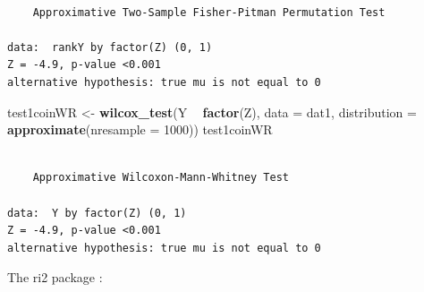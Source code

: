 \documentclass[
  12pt,
]{book}
\newenvironment{Shaded}{\begin{snugshade}}{\end{snugshade}}
\newcommand{\CommentTok}[1]{\textcolor[rgb]{0.56,0.35,0.01}{\textit{#1}}}
\newcommand{\DataTypeTok}[1]{\textcolor[rgb]{0.13,0.29,0.53}{#1}}
\newcommand{\DecValTok}[1]{\textcolor[rgb]{0.00,0.00,0.81}{#1}}
\newcommand{\KeywordTok}[1]{\textcolor[rgb]{0.13,0.29,0.53}{\textbf{#1}}}
\newcommand{\NormalTok}[1]{#1}
\newcommand{\OperatorTok}[1]{\textcolor[rgb]{0.81,0.36,0.00}{\textbf{#1}}}
\newcommand{\StringTok}[1]{\textcolor[rgb]{0.31,0.60,0.02}{#1}}
\theoremstyle{definition}
\theoremstyle{definition}
\theoremstyle{definition}
\theoremstyle{remark}
\begin{document}
\begin{verbatim}

    Approximative Two-Sample Fisher-Pitman Permutation Test

data:  rankY by factor(Z) (0, 1)
Z = -4.9, p-value <0.001
alternative hypothesis: true mu is not equal to 0
\end{verbatim}

\begin{Shaded}
\begin{Highlighting}[]
\NormalTok{test1coinWR <-}\StringTok{ }\KeywordTok{wilcox_test}\NormalTok{(Y }\OperatorTok{~}\StringTok{ }\KeywordTok{factor}\NormalTok{(Z), }\DataTypeTok{data =}\NormalTok{ dat1, }\DataTypeTok{distribution =} \KeywordTok{approximate}\NormalTok{(}\DataTypeTok{nresample =} \DecValTok{1000}\NormalTok{))}
\NormalTok{test1coinWR}
\end{Highlighting}
\end{Shaded}

\begin{verbatim}

    Approximative Wilcoxon-Mann-Whitney Test

data:  Y by factor(Z) (0, 1)
Z = -4.9, p-value <0.001
alternative hypothesis: true mu is not equal to 0
\end{verbatim}

The ri2 package \citep{R-ri2}:

\begin{Shaded}
\end{Shaded}
\end{document}
